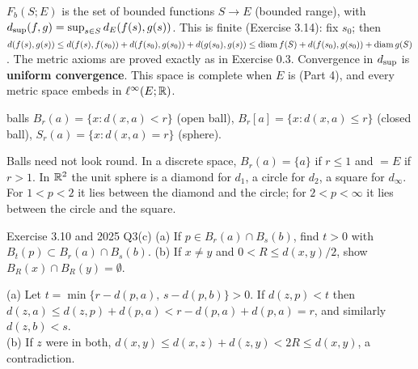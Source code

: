 $F_b(S;E)$ is the set of bounded functions $S\to E$ (bounded range), with
$d_{\sup}(f,g)=\sup_{s\in S}d_E(f(s),g(s))$. This is finite (Exercise 3.14): fix $s_0$; then
$d(f(s),g(s))\le d(f(s),f(s_0))+d(f(s_0),g(s_0))+d(g(s_0),g(s))\le\operatorname{diam} f(S)+d(f(s_0),g(s_0))+
\operatorname{diam} g(S)$. The metric axioms are proved exactly as in Exercise 0.3. Convergence in $d_{\sup}$
is \textbf{uniform convergence}. This space is complete when $E$ is (Part 4), and every metric
space embeds in $\ell^\infty(E;\mathbb R)$.

\begin{defn}{balls}
$B_r(a)=\{x:d(x,a)<r\}$ (open ball), $B_r[a]=\{x:d(x,a)\le r\}$ (closed ball),
$S_r(a)=\{x:d(x,a)=r\}$ (sphere).
\end{defn}
\begin{plain}
Balls need not look round. In a discrete space, $B_r(a)=\{a\}$ if $r\le1$ and $=E$ if $r>1$.
In $\mathbb R^2$ the unit sphere is a diamond for $d_1$, a circle for $d_2$, a square for $d_\infty$.
For $1<p<2$ it lies between the diamond and the circle; for $2<p<\infty$ it lies between the
circle and the square.
\end{plain}
\begin{center}
\end{center}

\begin{exam}{Exercise 3.10 and 2025 Q3(c)}
(a) If $p\in B_r(a)\cap B_s(b)$, find $t>0$ with $B_t(p)\subset B_r(a)\cap B_s(b)$.
(b) If $x\ne y$ and $0<R\le d(x,y)/2$, show $B_R(x)\cap B_R(y)=\emptyset$.
\end{exam}
\begin{answer}
(a) Let $t=\min\{r-d(p,a),\,s-d(p,b)\}>0$. If $d(z,p)<t$ then
$d(z,a)\le d(z,p)+d(p,a)<r-d(p,a)+d(p,a)=r$, and similarly $d(z,b)<s$.\\
(b) If $z$ were in both, $d(x,y)\le d(x,z)+d(z,y)<2R\le d(x,y)$, a contradiction.
\end{answer}

